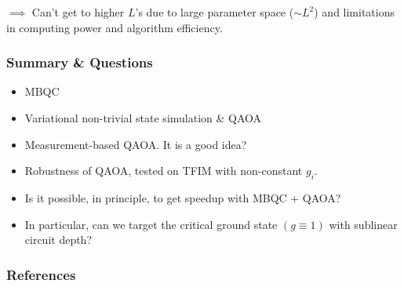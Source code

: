 \documentclass{beamer}
\theoremstyle{definition}
\begin{document}
\begin{frame}

$\implies$ Can't get to higher $L$'s due to large parameter space ($\sim L^2$) and limitations in computing power and algorithm efficiency.











\end{frame}






\begin{frame}
\frametitle{Summary \& Questions}


\begin{itemize}
	\item MBQC
	\item Variational non-trivial state simulation \& QAOA
	\item Measurement-based QAOA. It is a good idea?
	\item Robustness of QAOA, tested on TFIM with non-constant $g_i$.
	
	
	\item Is it possible, in principle, to get speedup with MBQC + QAOA?
	
	
	\item In particular, can we target the critical ground state $(g\equiv 1)$ with sublinear circuit depth?
	
\end{itemize}


\end{frame}




\begin{frame}[allowframebreaks]
\frametitle{References}




{}



\end{frame}
\end{document}
